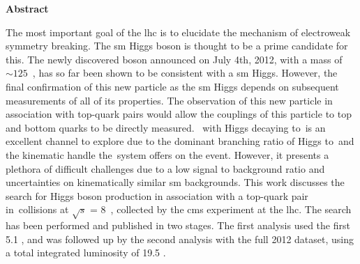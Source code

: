 \begin{center}

\textbf{\Large Abstract}\\[0.25in]

\end{center}

\par The most important goal of the \acrfull{lhc} is to elucidate the mechanism of electroweak symmetry breaking.  The \acrfull{sm} Higgs boson is thought to be a prime candidate for this.  The newly discovered boson announced on July 4th, 2012, with a mass of ${\sim}125$~\GeVcc, has so far been shown to be consistent with a \acrshort{sm} Higgs.  However, the final confirmation of this new particle as the \acrshort{sm} Higgs depends on subsequent measurements of all of its properties.  The observation of this new particle in association with top-quark pairs would allow the couplings of this particle to top and bottom quarks to be directly measured. ~\ttH with Higgs decaying to~\bbbar is an excellent channel to explore due to the dominant branching ratio of Higgs to~\bbbar and  the kinematic handle the~\ttbar system offers on the event.  However, it presents a plethora of difficult challenges due to a low signal to background ratio and uncertainties on kinematically similar \acrshort{sm} backgrounds.  This work discusses the search for Higgs boson production in association with a top-quark pair in~\pp collisions at $\sqrt{s}$ = 8~\TeV, collected by the \acrfull{cms} experiment at the \acrshort{lhc}.  The search has been performed and published in two stages.  The first analysis used the first 5.1 \fbinv, and was followed up by the second analysis with the full 2012 dataset, using a total integrated luminosity of 19.5 \fbinv.      

